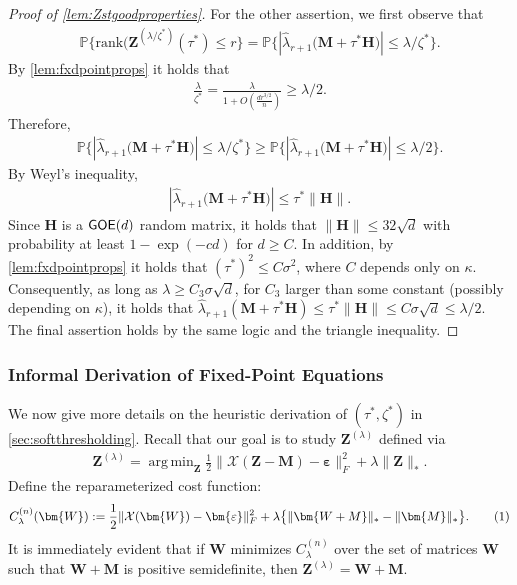 \documentclass[10pt]{article}
\newcommand\numberthis{\addtocounter{equation}{1}\tag{\theequation}}
\DeclareMathOperator*{\argmin}{arg\,min}
\newcommand{\eps}{\ensuremath{\varepsilon}}
\newcommand{\s}{^*}
\newcommand{\p}{\mathbb{P}}
\renewcommand{\hat}{\widehat}
\theoremstyle{definition}
\begin{document}
\begin{proof}[Proof of \cref{lem:Zstgoodproperties}]
    For the other assertion, we first observe that
    \begin{align}
        \p\bigg\{ \mathrm{rank}(\bm{Z}^{(\lambda/\zeta\s)}(\tau\s) \leq r \bigg\} = \p\bigg\{ |\hat \lambda_{r+1}\big( \bm{M} + \tau\s \bm{H} \big) |\leq \lambda/\zeta\s \bigg\}.
    \end{align}
By \cref{lem:fxdpointprops} it holds that 
\begin{align*}
    \frac{\lambda}{\zeta\s} = \frac{\lambda}{1 + O( \frac{d r^{3/2}}{n})}  \geq \lambda/2. 
\end{align*}
Therefore, 
\begin{align}
    \p\bigg\{ |\hat \lambda_{r+1}\big( \bm{M} + \tau\s \bm{H} \big) |\leq \lambda/\zeta\s \bigg\} \geq \p\bigg\{ |\hat \lambda_{r+1}\big( \bm{M} + \tau\s \bm{H} \big) |\leq  \lambda/2 \bigg\}.
\end{align} By Weyl's inequality,
    \begin{align}
        | \hat \lambda_{r+1}\big( \bm{M} + \tau\s \bm{H} \big)| \leq \tau\s \| \bm{H} \|.
    \end{align}
    Since $\bm{H}$ is a ${\sf GOE}(d)$ random matrix, it holds that $\| \bm{H} \| \leq 32 \sqrt{d}$ with probability at least $1 - \exp( - c d)$ for $d \geq C$. In addition, by \cref{lem:fxdpointprops} it holds that $(\tau\s)^2 \leq C \sigma^2$, where $C$ depends only on $\kappa$.  Consequently, as long as $\lambda \geq C_3 \sigma \sqrt{d}$, for $C_3$ larger than some constant (possibly depending on $\kappa$), it holds that $\hat \lambda_{r+1}( \bm{M} + \tau\s \bm{H}) \leq \tau\s \|\bm{H} \| \leq C \sigma \sqrt{d}\leq  \lambda/2$.  The final assertion holds by the same logic and the triangle inequality.  
\end{proof}


\subsubsection{Informal Derivation of Fixed-Point Equations} \label{sec:heuristicderivation}
We now give more details on the heuristic derivation of $(\tau\s,\zeta\s)$ in \cref{sec:softthresholding}.  
Recall that our goal is to study $\bm{Z}^{(\lambda)}$ defined via
\begin{align}
 \bm{Z}^{(\lambda)} =    \argmin_{\bm{Z}} \frac{1}{2} \| \mathcal{X}(\bm{Z - M}) - \bm{\eps} \|_F^2 + \lambda \| \bm{Z} \|_*.
\end{align}
Define the reparameterized cost function:
\begin{align}
C^{(n)}_{\lambda}(\bm{W}) := \frac{1}{2}     \| \mathcal{X}(\bm{W}) - \bm{\eps} \|_F^2 + \lambda\big\{ \| \bm{W + M}  \|_* - \| \bm{M} \|_* \big\}. \numberthis \label{Cndef}
\end{align}
It is immediately evident that if $\bm{W}$ minimizes $C_{\lambda}^{(n)}$ over the set of matrices $\bm{W}$ such that $\bm{W} + \bm{M}$ is positive semidefinite, then $\bm{Z}^{(\lambda)} = \bm{W} + \bm{M}$.  
\end{document}
